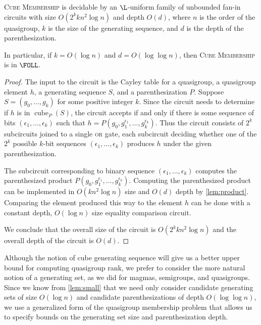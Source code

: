 \documentclass{article}
\DeclareMathOperator{\cube}{cube}
\begin{document}
\begin{lemma}\label{lem:cubemem}
  \textsc{Cube Membership} is decidable by an $\L$-uniform family of unbounded fan-in circuits with size $O(2^k k n^2 \log n)$ and depth $O(d)$, where $n$ is the order of the quasigroup, $k$ is the size of the generating sequence, and $d$ is the depth of the parenthesization.

  In particular, if $k = O(\log n)$ and $d = O(\log \log n)$, then \textsc{Cube Membership} is in $\FOLL$.
\end{lemma}
\begin{proof}
  The input to the circuit is the Cayley table for a quasigroup, a quasigroup element $h$, a generating sequence $S$, and a parenthesization $P$.
  Suppose $S = (g_0, \dotsc, g_k)$ for some positive integer $k$.
  Since the circuit needs to determine if $h$ is in $\cube_P(S)$, the circuit accepts if and only if there is some sequence of bits $(\epsilon_1, \dotsc, \epsilon_k)$ such that $h = P(g_0, g_1^{\epsilon_1}, \dotsc, g_k^{\epsilon_k})$.
  Thus the circuit consists of $2^k$ subcircuits joined to a single \textsc{or} gate, each subcircuit deciding whether one of the $2^k$ possible $k$-bit sequences $(\epsilon_1, \dotsc, \epsilon_k)$ produces $h$ under the given parenthesization.

  The subcircuit corresponding to binary sequence $(\epsilon_1, \dotsc, \epsilon_k)$ computes the parenthesized product $P(g_0, g_1^{\epsilon_1}, \dotsc, g_k^{\epsilon_k})$.
  Computing the parenthesized product can be implemented in $O(k n^2 \log n)$ size and $O(d)$ depth by \autoref{lem:product}.
  Comparing the element produced this way to the element $h$ can be done with a constant depth, $O(\log n)$ size equality comparison circuit.

  We conclude that the overall size of the circuit is $O(2^k k n^2 \log n)$ and the overall depth of the circuit is $O(d)$.
\end{proof}

Although the notion of cube generating sequence will give us a better upper bound for computing quasigroup rank, we prefer to consider the more natural notion of a generating set, as we did for magmas, semigroups, and quasigroups.
Since we know from \autoref{lem:small} that we need only consider candidate generating sets of size $O(\log n)$ and candidate parenthesizations of depth $O(\log \log n)$, we use a generalized form of the quasigroup membership problem that allows us to specify bounds on the generating set size and parenthesization depth.
\end{document}
